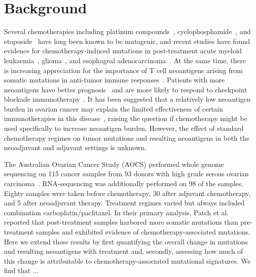 \section*{Background}

Several chemotherapies including platinum compounds~\cite{Hannan_1989}, cyclophosphamide~\cite{Anderson_1995}, and etoposide~\cite{NAKANOMYO_1986} have long been known to be mutagenic, and recent studies have found evidence for chemotherapy-induced mutations in post-treatment acute myeloid leukaemia~\cite{Ding_2012}, glioma~\cite{Johnson_2013}, and esophageal adenocarcinoma~\cite{Murugaesu_2015}. At the same time, there is increasing appreciation for the importance of T cell neoantigens arising from somatic mutations in anti-tumor immune responses~\cite{Schumacher_2015}. Patients with more neoantigens have better prognosis~\cite{Brown_2014} and are more likely to respond to checkpoint blockade immunotherapy~\cite{Van_Allen_2015,Rizvi_2015}. It has been suggested that a relatively low neoantigen burden in ovarian cancer may explain the limited effectiveness of certain immunotherapies in this disease~\cite{Martin_2016}, raising the question if chemotherapy might be used specifically to increase neoantigen burden. However, the effect of standard chemotherapy regimes on tumor mutations and resulting neoantigens in both the neoadjuvant and adjuvant settings is unknown.

The Australian Ovarian Cancer Study (AOCS) performed whole genome sequencing on 115 cancer samples from 93 donors with high grade serous ovarian carcinoma~\cite{Patch_2015}. RNA-sequencing was additionally performed on 98 of the samples. Eighty samples were taken before chemotherapy, 30 after adjuvant chemotherapy, and 5 after neoadjuvant therapy. Treatment regimes varied but always included combination carboplatin/paclitaxel. In their primary analysis, Patch et al. reported that post-treatment samples harbored more somatic mutations than pre-treatment samples and exhibited evidence of chemotherapy-associated mutations. Here we extend these results by first quantifying the overall change in mutations and resulting neoantigens with treatment and, secondly, assessing how much of this change is attributable to chemotherapy-associated mutational signatures. We find that ...



